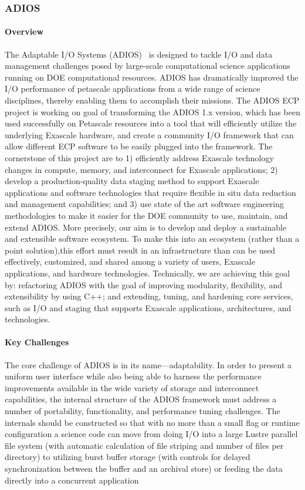 \subsubsection{ ADIOS} 
\paragraph{Overview} 
The Adaptable I/O Systems (ADIOS)~\cite{adios2-softwarex-2020,liu2014hello} is designed to tackle I/O and data management challenges posed  by  large-scale computational science applications running on DOE computational resources. ADIOS has  dramatically  improved  the I/O performance of petascale  applications from a   wide range of science disciplines, thereby enabling them to accomplish their missions. The ADIOS ECP project is working on goal of transforming the ADIOS 1.x version, which has been used successfully on Petascale resources into a tool that will efficiently utilize  the underlying Exascale hardware, and create a   community I/O framework that can allow different ECP software to be easily  plugged into the framework. The cornerstone of this project are to 1) efficiently  address Exascale technology changes in compute, memory, and interconnect for Exascale applications; 2) develop  a  production-quality data staging method to support Exascale applications and software  technologies that require flexible in situ data reduction and management capabilities; and 3) use state  of the  art software engineering methodologies to    make it   easier for the DOE community to    use, maintain, and extend ADIOS. More precisely, our aim is to    develop and deploy a   sustainable and extensible software ecosystem. To make this into an ecosystem (rather than a point solution),this effort must result in  an  infrastructure than can be used effectively, customized, and shared among a   variety of users, Exascale applications, and hardware technologies. Technically, we are achieving  this goal  by: refactoring ADIOS  with the  goal  of improving modularity, flexibility, and extensibility by using C++; and extending, tuning, and hardening core services, such as I/O and staging that supports Exascale applications, architectures, and technologies.

\paragraph{Key Challenges}
The core challenge of ADIOS is in its name---adaptability.  In order to present a uniform user interface while also being able to harness the performance improvements available in the wide variety of storage and interconnect capabilities, the internal structure of the ADIOS framework must address a number of portability, functionality, and performance tuning challenges.  The internals should be constructed so that with no more than a small flag or runtime configuration a science code can move from doing I/O into a large Lustre parallel file system (with automatic calculation of file striping and number of files per directory) to utilizing burst buffer storage (with controls for delayed synchronization between the buffer and an archival store) or feeding the data directly into a concurrent application   

